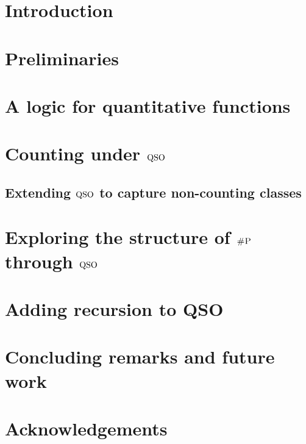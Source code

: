 \documentclass[conference]{IEEEtran}
\begin{document}
\IEEEpeerreviewmaketitle

\section{Introduction}


\section{Preliminaries} \label{sec:preliminaries}


\section{A logic for quantitative functions} \label{sec:logic}


\section{Counting under ${\rm QSO}$} \label{sec:complexity}


\subsection{Extending ${\rm QSO}$ to capture non-counting classes} \label{sec:extentions}


\section{Exploring the structure of $\text{\sc \#P}$ through ${\rm QSO}$} \label{sec:syntactic}


\section{Adding recursion to QSO}\label{sec:beyond}




\section{Concluding remarks and future work}\label{sec:conclusions}


\section{Acknowledgements}


\end{document}
